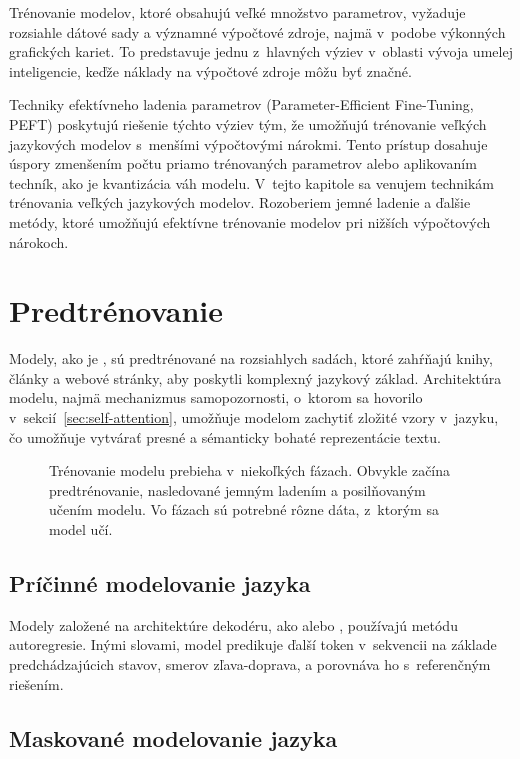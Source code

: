 Trénovanie modelov, ktoré obsahujú veľké množstvo parametrov, vyžaduje rozsiahle dátové sady a významné výpočtové zdroje, najmä v~podobe výkonných grafických kariet. To predstavuje jednu z~hlavných výziev v~oblasti vývoja umelej inteligencie, keďže náklady na výpočtové zdroje môžu byť značné.

Techniky efektívneho ladenia parametrov (Parameter-Efficient Fine-Tuning, PEFT) poskytujú riešenie týchto výziev tým, že umožňujú trénovanie veľkých jazykových modelov s~menšími výpočtovými nárokmi. Tento prístup dosahuje úspory zmenšením počtu priamo trénovaných parametrov alebo aplikovaním techník, ako je kvantizácia váh modelu. V~tejto kapitole sa venujem technikám trénovania veľkých jazykových modelov. Rozoberiem jemné ladenie a ďalšie metódy, ktoré umožňujú efektívne trénovanie modelov pri nižších výpočtových nárokoch.

\section{Predtrénovanie}

Modely, ako je \GPT{}, sú predtrénované na rozsiahlych sadách, ktoré zahŕňajú knihy, články a webové stránky, aby poskytli komplexný jazykový základ. Architektúra modelu, najmä mechanizmus samopozornosti, o~ktorom sa hovorilo v~sekcií~\ref{sec:self-attention}, umožňuje modelom zachytiť zložité vzory v~jazyku, čo umožňuje vytvárať presné a sémanticky bohaté reprezentácie textu.

\begin{figure}[H]
    \centering
    
    \caption{Trénovanie modelu prebieha v~niekoľkých fázach. Obvykle začína predtrénovanie, nasledované jemným ladením a posilňovaným učením modelu. Vo fázach sú potrebné rôzne dáta, z~ktorým sa model učí.}
    \label{fig:training}
\end{figure}

\subsection*{Príčinné modelovanie jazyka}

Modely založené na architektúre dekodéru, ako \GPT{} alebo \LLAMA{}, používajú metódu autoregresie. Inými slovami, model predikuje ďalší token v~sekvencii na základe predchádzajúcich stavov, smerov zľava-doprava, a porovnáva ho s~referenčným riešením.

\subsection*{Maskované modelovanie jazyka}

